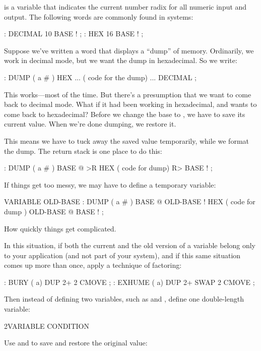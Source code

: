 %
 is a variable that indicates the current
number radix for all numeric input and output. The following words are
commonly found in \Forth{} systems:

\begin{Code}
: DECIMAL   10 BASE ! ;
: HEX   16 BASE ! ;
\end{Code}
Suppose we've written a word that displays a ``dump'' of memory.
Ordinarily, we work in decimal mode, but we want the dump in hexadecimal.
So we write:

\begin{Code}
: DUMP  ( a # )
   HEX   ...   ( code for the dump) ... DECIMAL ;
\end{Code}
This works---most of the time. But there's a presumption that we want to
come back to decimal mode. What if it had been working in hexadecimal, and
wants to come back to hexadecimal? Before we change the base to
, we have to save its current value. When we're done dumping,
we restore it.

This means we have to tuck away the saved value temporarily,
while we format the dump. The return stack is one place to do this:

\begin{Code}
: DUMP  ( a # )
   BASE @ >R  HEX   ( code for dump)  R> BASE ! ;
\end{Code}
If things get too messy, we may have to define a temporary variable:

\begin{Code}
VARIABLE OLD-BASE
: DUMP  ( a # )
   BASE @  OLD-BASE !  HEX ( code for dump )
   OLD-BASE @  BASE ! ;
\end{Code}
How quickly things get complicated.%

In this situation, if both the current and the old version of a variable
belong only to your application (and not part of your system), and if this
same situation comes up more than once, apply a technique of factoring:

\begin{Code}
: BURY  ( a)  DUP 2+  2 CMOVE ;
: EXHUME  ( a)  DUP 2+  SWAP 2 CMOVE ;
\end{Code}
Then instead of defining two variables, such as  and
, define one double-length variable:

\begin{Code}
2VARIABLE CONDITION
\end{Code}
Use  and  to save and restore the original value:


